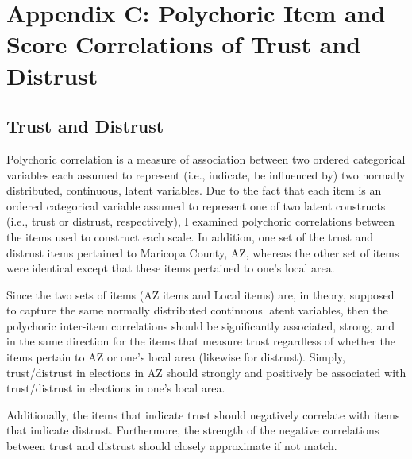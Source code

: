 \documentclass[
  12pt,
  letterpaper,
]{article}
\begin{document}
\newpage{}

\section{Appendix C: Polychoric Item and Score Correlations of Trust and
Distrust}\label{appendix-c-polychoric-item-and-score-correlations-of-trust-and-distrust}

\subsection{Trust and Distrust}\label{trust-and-distrust}

Polychoric correlation is a measure of association between two ordered
categorical variables each assumed to represent (i.e., indicate, be
influenced by) two normally distributed, continuous, latent variables.
Due to the fact that each item is an ordered categorical variable
assumed to represent one of two latent constructs (i.e., trust or
distrust, respectively), I examined polychoric correlations between the
items used to construct each scale. In addition, one set of the trust
and distrust items pertained to Maricopa County, AZ, whereas the other
set of items were identical except that these items pertained to one's
local area.

Since the two sets of items (AZ items and Local items) are, in theory,
supposed to capture the same normally distributed continuous latent
variables, then the polychoric inter-item correlations should be
significantly associated, strong, and in the same direction for the
items that measure trust regardless of whether the items pertain to AZ
or one's local area (likewise for distrust). Simply, trust/distrust in
elections in AZ should strongly and positively be associated with
trust/distrust in elections in one's local area.

Additionally, the items that indicate trust should negatively correlate
with items that indicate distrust. Furthermore, the strength of the
negative correlations between trust and distrust should closely
approximate if not match.
\end{document}
